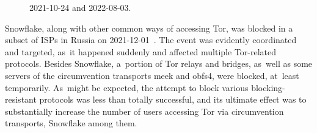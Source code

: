 \documentclass[letterpaper,twocolumn]{article}
\begin{document}
\begin{figure}
{\begin{minipage}[b][\textheight][b]{\linewidth}
{%
\mbox{2021-10-24} and \mbox{2022-08-03}.
\label{fig:client-counts-tm}
}
\end{minipage}}
\end{figure}


Snowflake, along with other common ways of accessing Tor,
was blocked in a subset of ISPs in Russia
on \mbox{2021-12-01}~\cite{ooni-2021-russia-blocks-tor}.
The event was evidently coordinated and targeted,
as~it happened suddenly and affected multiple Tor-related protocols.
Besides Snowflake,
a~portion of Tor relays and bridges,
as~well as some servers of
the circumvention transports meek and obfs4,
were blocked, at~least temporarily.
As~might be expected, the attempt to block
various blocking-resistant protocols
was less than totally successful,
and its ultimate effect was to substantially increase the number
of users accessing Tor via circumvention transports,
Snowflake among them.
\end{document}
